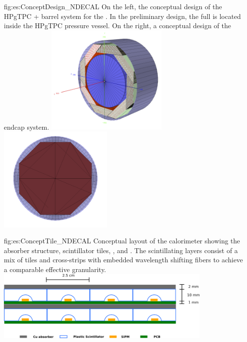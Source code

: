 \begin{dunefigure}{fig:es:ConceptDesign_NDECAL}
{On the left, the conceptual design of the HPgTPC +  barrel system for the . In the preliminary design, the full  is located inside the HPgTPC pressure vessel. On the right, a conceptual design of the  endcap system.}
\includegraphics[width=0.45\textwidth]{graphics/ConceptECALND.png}
\includegraphics[width=0.42\textwidth]{graphics/ECAL_Endcap_System.png}
\end{dunefigure}

\begin{dunefigure}{fig:es:ConceptTile_NDECAL}
{Conceptual layout of the calorimeter showing the absorber structure, scintillator tiles, , and . The scintillating layers consist of a mix of tiles and cross-strips with embedded wavelength shifting fibers to achieve a comparable effective granularity.}
\includegraphics[width=0.8\textwidth]{graphics/TileConcept.png}
\end{dunefigure}

